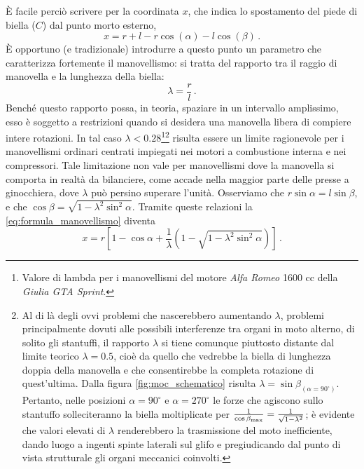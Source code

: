 \noindent \`E facile perci\`o scrivere per la coordinata $x$, che indica lo
spostamento del piede di biella ($C$) dal punto morto esterno, 
\begin{equation}
x= r+l - r \cos (\alpha) - l \cos (\beta)\,.
\label{eq:formula_manovellismo}
\end{equation}
\noindent \`E opportuno (e tradizionale) introdurre a questo punto un parametro
che caratterizza fortemente il manovellismo: si tratta del rapporto tra il raggio
di manovella e la lunghezza della biella:
\begin{equation}
\lambda= \frac{r}{l}\,.
\end{equation}
\noindent Bench\'e questo rapporto possa, in teoria, spaziare in un intervallo
amplissimo, esso \`e soggetto a restrizioni quando si desidera una manovella 
libera di compiere intere rotazioni. In tal caso $\lambda< 0.28$\footnote
{Valore di lambda per i manovellismi del motore {\em Alfa Romeo} 1600 cc della
{\em Giulia GTA Sprint}.}\footnote{Al di l\`a degli ovvi problemi che 
nascerebbero aumentando $\lambda$, problemi principalmente dovuti 
alle possibili interferenze tra organi in moto alterno, di solito gli stantuffi,
il rapporto $\lambda$ si tiene comunque piuttosto distante dal limite teorico
$\lambda=0.5$, cio\`e da quello che vedrebbe la biella di lunghezza doppia
della manovella e che consentirebbe la completa rotazione di quest'ultima.
Dalla figura \ref{fig:moc_schematico} risulta $\lambda={\sin
\beta_{\scriptscriptstyle{(\alpha= 90^{\circ})}}}$. Pertanto, nelle posizioni
$\alpha=90^{\circ}$ e $\alpha=270^{\circ}$ le forze che agiscono sullo stantuffo
solleciteranno la biella
moltiplicate per $\frac{1}{\cos \beta_{\scriptscriptstyle {\rm max}}}=\frac{1}{\sqrt{1-\lambda^2}}$; \`e evidente che valori
elevati di $\lambda$ renderebbero
la trasmissione del moto inefficiente, dando luogo a ingenti spinte laterali sul glifo
e pregiudicando dal punto di vista strutturale
gli organi meccanici coinvolti.}
risulta essere un limite ragionevole per i manovellismi ordinari centrati impiegati nei motori a combustione interna e nei compressori.
Tale limitazione non vale per manovellismi dove la manovella si comporta in
realt\`a da bilanciere, come accade nella maggior parte delle presse a
ginocchiera, dove $\lambda$ pu\`o persino superare l'unit\`a.
Osserviamo che $r \sin \alpha = l \sin\beta$, e che
$\cos \beta=\sqrt{1-\lambda^2 \sin^2\alpha}$.
Tramite queste relazioni la \ref{eq:formula_manovellismo} diventa 
\begin{equation}
x= r[1 - \cos \alpha + \frac{1}{\lambda} (1 -  \sqrt{1-\lambda^2 \sin^2\alpha})]\,.
\label{eq:formula_manovellismo_1}
\end{equation}
